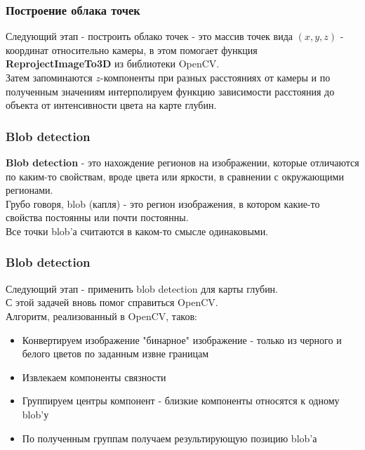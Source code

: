 \documentclass{beamer}
\begin{document}
		\begin{frame}
			\frametitle{Построение облака точек}
			
			Следующий этап - построить облако точек - это массив
			точек вида $(x, y, z)$ - координат относительно камеры, в
			этом помогает функция \textbf{ReprojectImageTo3D} из библиотеки
			OpenCV.\\
			Затем запоминаются $z$-компоненты при разных расстояниях от камеры
			и по полученным значениям интерполируем функцию зависимости
			расстояния до объекта от интенсивности цвета на карте глубин.
			
		\end{frame}
		
		\begin{frame}
			\frametitle{Blob detection}
			
			\textbf{Blob detection} - это нахождение регионов на изображении,
			которые отличаются по каким-то свойствам, вроде цвета
			или яркости, в сравнении с окружающими регионами.\\
			Грубо говоря, blob (капля) - это регион изображения,
			в котором какие-то свойства постоянны или почти
			постоянны.\\
			Все точки blob'а считаются в каком-то смысле
			одинаковыми.\\
			
		\end{frame}
		
		\begin{frame}
			\frametitle{Blob detection}
			
			Следующий этап - применить blob detection для карты глубин.\\
			С этой задачей вновь помог справиться OpenCV.\\
			Алгоритм, реализованный в OpenCV, таков:\\
			\begin{itemize}
				\item Конвертируем изображение "бинарное" изображение - только
					  из черного и белого цветов по заданным извне границам
				\item Извлекаем компоненты связности
				\item Группируем центры компонент - близкие компоненты относятся к одному blob'у
				\item По полученным группам получаем результирующую позицию blob'а
			\end{itemize}
			
		\end{frame}
\end{document}

